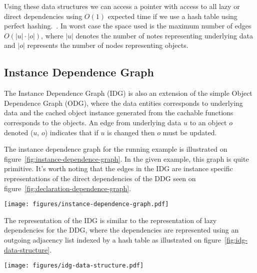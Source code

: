 Using these data structures we can access a pointer with access to all lazy or direct dependencies using $O(1)$ expected time if we use a hash table using perfect hashing.~\cite{paper:perfect-hashing}. In worst case the space used is the maximum number of edges $O(|u| \cdot |o|)$, where $|u|$ denotes the number of notes representing underlying data and $|o|$ represents the number of nodes representing objects.


\subsection{Instance Dependence Graph}
\label{subsec:instance-dependence-graph}

The Instance Dependence Graph (IDG) is also an extension of the simple Object Dependence Graph (ODG), where the data entities corresponds to underlying data and the cached object instance generated from the cachable functions corresponds to the objects. An edge from underlying data $u$ to an object $o$ denoted ($u$, $o$) indicates that if $u$ is changed then $o$ must be updated.

The instance dependence graph for the running example is illustrated on figure~\ref{fig:instance-dependence-graph}. In the given example, this graph is quite primitive. It's worth noting that the edges in the IDG are instance specific representations of the direct dependencies of the DDG seen on figure~\ref{fig:declaration-dependence-graph}.

\begin{figure*}[ht!]
  \centering
  \texttt{[image: figures/instance-dependence-graph.pdf]}
  \caption{An example of an Instance Dependence Graph based on the running example}
  \label{fig:instance-dependence-graph}
\end{figure*}

The representation of the IDG is similar to the representation of lazy dependencies for the DDG, where the dependencies are represented using an outgoing adjacency list indexed by a hash table as illustrated on figure~\ref{fig:idg-data-structure}.

\begin{figure*}[ht!]
  \centering
  \texttt{[image: figures/idg-data-structure.pdf]}
  \caption{An illustration of the data structure representing the IDG on figure~\ref{fig:instance-dependence-graph}}
  \label{fig:idg-data-structure}
\end{figure*}

